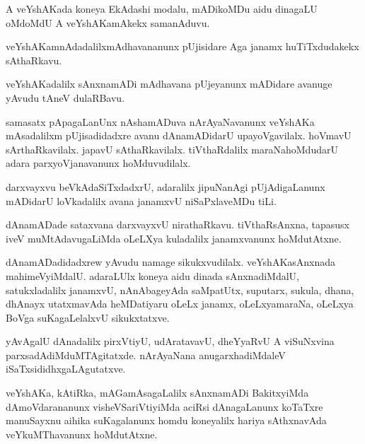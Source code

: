 \documentclass{article}
\begin{document}
\begin{mn}%
A veYshAKada koneya EkAdashi modalu, mADikoMDu aidu dinagaLU oMdoMdU A veYshAKamAkekx 
samanAduvu.
\end{mn}

\begin{mn}%
veYshAKamnAdadalilxmAdhavananunx pUjisidare Aga janamx huTiTxdudakekx sAthaRkavu.
\end{mn}

\begin{mn}%
veYshAKadalilx sAnxnamADi mAdhavana pUjeyanunx mADidare  avanuge yAvudu tAneV dulaRBavu.
\end{mn}

\begin{mn}%
samasatx pApagaLanUnx nAshamADuva nArAyaNavanunx veYshAKa  mAsadalilxm pUjisadidadxre 
avanu dAnamADidarU upayoVgavilalx. hoVmavU sArthaRkavilalx. japavU sAthaRkavilalx. 
tiVthaRdalilx maraNahoMdudarU adara parxyoVjanavanunx hoMduvudilalx.
\end{mn}

\begin{mn}%
darxvayxvu beVkAdaSiTxdadxrU, adaralilx jipuNanAgi pUjAdigaLanunx mADidarU loVkadalilx 
avana janamxvU niSaPxlaveMDu tiLi.
\end{mn}

\begin{mn}%
dAnamADade sataxvana darxvayxvU nirathaRkavu. tiVthaRsAnxna, tapasusx iveV 
muMtAdavugaLiMda oLeLXya kuladalilx janamxvanunx hoMdutAtxne.
\end{mn}

\begin{mn}%
dAnamADadidadxrew yAvudu namage sikukxvudilalx. veYshAKasAnxnada mahimeVyiMdalU. adaraLUlx 
koneya aidu dinada sAnxnadiMdalU, satukxladalilx janamxvU, nAnAbageyAda saMpatUtx, 
suputarx, sukula, dhana, dhAnayx utatxmavAda heMDatiyaru oLeLx janamx, oLeLxyamaraNa, 
oLeLxya BoVga suKagaLelalxvU sikukxtatxve.
\end{mn}

\begin{mn}%
yAvAgalU dAnadalilx pirxVtiyU, udAratavavU, dheYyaRvU A viSuNxvina 
parxsadAdiMduMTAgitatxde. nArAyaNana anugarxhadiMdaleV iSaTxsididhxgaLAgutatxve.
\end{mn}

\begin{mn}%
veYshAKa, kAtiRka, mAGamAsagaLalilx sAnxnamADi BakitxyiMda dAmoVdarananunx 
visheVSariVtiyiMda aciRsi dAnagaLanunx koTaTxre manuSayxnu aihika suKagalanunx homdu 
koneyalilx hariya sAthxnavAda veYkuMThavanunx hoMdutAtxne.
\end{mn}
\end{document}
